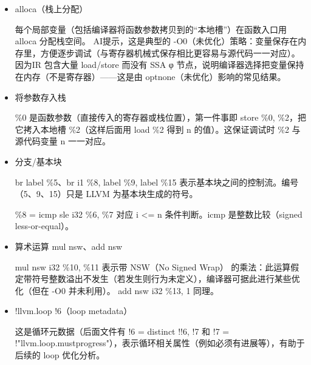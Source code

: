 \documentclass[a4paper]{article}
\begin{document}
\begin{itemize}
	\item alloca（栈上分配） 
	
	每个局部变量（包括编译器将函数参数拷贝到的“本地槽”）在函数入口用 alloca 分配栈空间。
	AI提示，这是典型的 -O0（未优化）策略：变量保存在内存里，方便逐步调试（与寄存器机械式保存相比更容易与源代码一一对应）。 因为IR 包含大量 load/store 而没有 SSA φ 节点，说明编译器选择把变量保持在内存（不是寄存器）——这是由 optnone（未优化）影响的常见结果。
	\item 将参数存入栈
	
	\%0 是函数参数（直接传入的寄存器或栈位置），第一件事即 store \%0, \%2，把它拷入本地槽 \%2（这样后面用 load \%2 得到 n 的值）。这保证调试时 \%2 与源代码变量 n 一一对应。
	\item 分支/基本块
	
	br label \%5、br i1 \%8, label \%9, label \%15 表示基本块之间的控制流。编号（5、9、15）只是 LLVM 为基本块生成的符号。
	
	\%8 = icmp sle i32 \%6, \%7 对应 i <= n 条件判断。icmp 是整数比较（signed less-or-equal）。
	
	\item 算术运算 mul nsw、add nsw
	
	mul nsw i32 \%10, \%11 表示带 NSW（No Signed Wrap） 的乘法：此运算假定带符号整数溢出不发生（若发生则行为未定义），编译器可据此进行某些优化（但在 -O0 并未利用）。
	add nsw i32 \%13, 1 同理。
	\item !llvm.loop !6（loop metadata）
	
	这是循环元数据（后面文件有 !6 = distinct !{!6, !7} 和 !7 = !"llvm.loop.mustprogress"），表示循环相关属性（例如必须有进展等），有助于后续的 loop 优化分析。
\end{itemize}
\end{document}
